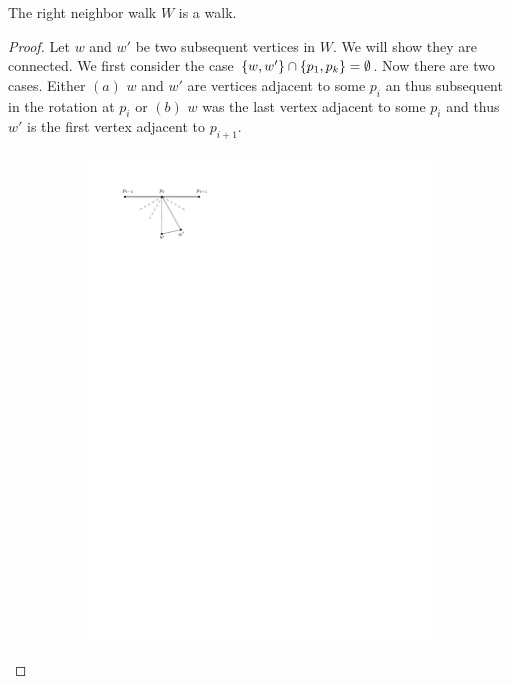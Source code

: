   \begin{lemma}
    \label{lm:uni:neighborWalk}
    The right neighbor walk $W$ is a walk.
  \end{lemma}
  \begin{proof}
    Let $w$ and $w'$ be two subsequent vertices in $W$. We will show they are connected. We first consider the case $\left\lbrace {w, w'} \right\rbrace \cap \left\lbrace {p_1, p_k } \right\rbrace = \emptyset$.
    Now there are two cases. Either $(a)$ $w$ and $w'$ are vertices adjacent to some $p_i$ an thus subsequent in the rotation at $p_i$  or $(b)$ $w$ was the last vertex adjacent to some $p_i$ and thus $w'$ is the first vertex adjacent to $p_{i+1}$.

  \begin{figure}[h]
    \centering
    \begin{subfigure}[b]{0.5\linewidth}
            \includegraphics[width=\linewidth]{unifiedAlgo/img/walkProofA}

\end{subfigure}
\end{figure}
\end{proof}
